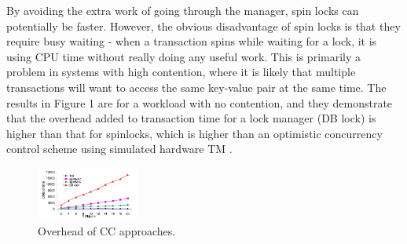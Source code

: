 By avoiding the extra work of going through the manager, spin locks can potentially be faster. However, the obvious disadvantage of spin locks is that they require busy waiting - when a transaction spins while waiting for a lock, it is using CPU time without really doing any useful work. This is primarily a problem in systems with high contention, where it is likely that multiple transactions will want to access the same key-value pair at the same time. The results in Figure 1 are for a workload with no contention, and they demonstrate that the overhead added to transaction time for a lock manager (DB lock) is higher than that for spinlocks, which is higher than an optimistic concurrency control scheme using simulated hardware TM \citep{tran2010transactional}.

\begin{figure}[h!]
  \centering
  \includegraphics[width=0.3\textwidth]{figure/overhead.jpg}
  \caption{Overhead of CC approaches.}
  \label{fig:fcommon} 
\end{figure}